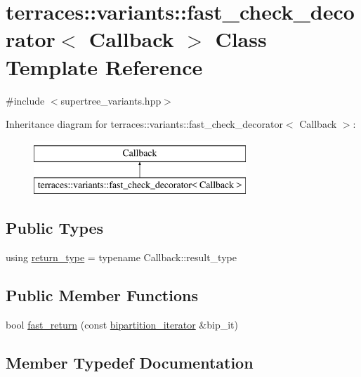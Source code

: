 \hypertarget{classterraces_1_1variants_1_1fast__check__decorator}{}\section{terraces\+:\+:variants\+:\+:fast\+\_\+check\+\_\+decorator$<$ Callback $>$ Class Template Reference}
\label{classterraces_1_1variants_1_1fast__check__decorator}


{\ttfamily \#include $<$supertree\+\_\+variants.\+hpp$>$}

Inheritance diagram for terraces\+:\+:variants\+:\+:fast\+\_\+check\+\_\+decorator$<$ Callback $>$\+:\begin{figure}[H]
\begin{center}
\leavevmode
\includegraphics[height=2.000000cm]{classterraces_1_1variants_1_1fast__check__decorator}
\end{center}
\end{figure}
\subsection*{Public Types}
\begin{DoxyCompactItemize}
\item 
using \hyperlink{classterraces_1_1variants_1_1fast__check__decorator_ae6258cfecb5cea22cf0a30ab3c0bbfe9}{return\+\_\+type} = typename Callback\+::result\+\_\+type
\end{DoxyCompactItemize}
\subsection*{Public Member Functions}
\begin{DoxyCompactItemize}
\item 
bool \hyperlink{classterraces_1_1variants_1_1fast__check__decorator_afc5fc595fa03aa85ed65a3741c5a97c0}{fast\+\_\+return} (const \hyperlink{classterraces_1_1bipartition__iterator}{bipartition\+\_\+iterator} \&bip\+\_\+it)
\end{DoxyCompactItemize}


\subsection{Member Typedef Documentation}
\mbox{\label{classterraces_1_1variants_1_1fast__check__decorator_ae6258cfecb5cea22cf0a30ab3c0bbfe9}} 
